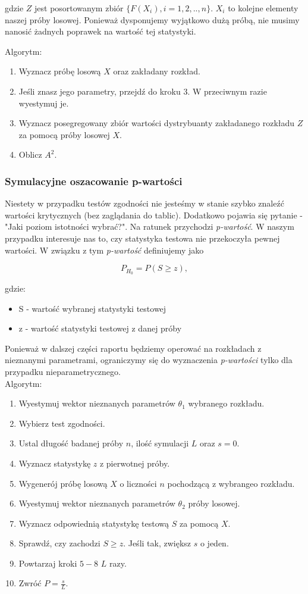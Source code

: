 \documentclass{article}
\theoremstyle{break}
\numberwithin{equation}{subsection}
\numberwithin{figure}{section}
\begin{document}
gdzie $Z$ jest posortowanym zbiór $\{F(X_i), i=1,2,..,n\}$. $X_i$ to kolejne elementy naszej próby losowej.
Ponieważ dysponujemy wyjątkowo dużą próbą, nie musimy nanosić żadnych poprawek na wartość tej statystyki.

Algorytm:

\begin{enumerate}
\item Wyznacz próbę losową $X$ oraz zakładany rozkład.
\item Jeśli znasz jego parametry, przejdź do kroku 3. W przeciwnym razie wyestymuj je.
\item Wyznacz posegregowany zbiór wartości dystrybuanty zakładanego rozkładu $Z$ za pomocą próby losowej $X$.
\item Oblicz $A^2$.
\end{enumerate}

\subsubsection{Symulacyjne oszacowanie p-wartości}

Niestety w przypadku testów zgodności nie jesteśmy w stanie szybko znaleźć wartości krytycznych (bez zaglądania do tablic). Dodatkowo pojawia się pytanie - "Jaki poziom istotności wybrać?". Na ratunek przychodzi \emph{p-wartość}. W naszym przypadku interesuje nas to, czy statystyka testowa nie przekoczyła pewnej wartości.
W związku z tym \emph{p-wartość} definiujemy jako 

$$P_{H_0} = P(S \ge z),$$

gdzie:

\begin{itemize}
\item S - wartość wybranej statystyki testowej
\item z - wartość statystyki testowej z danej próby
\end{itemize}

Ponieważ w dalszej części raportu będziemy operować na rozkładach z nieznanymi parametrami, ograniczymy się do wyznaczenia \emph{p-wartości} tylko dla przypadku nieparametrycznego.
\\
Algorytm:
\begin{enumerate}
\item Wyestymuj wektor nieznanych parametrów $\theta_1$ wybranego rozkładu.
\item Wybierz test zgodności.
\item Ustal długość badanej próby $n$, ilość symulacji $L$ oraz $s = 0$.
\item Wyznacz statystykę $z$ z pierwotnej próby.
\item Wygenerój próbę losową $X$ o liczności $n$ pochodzącą z wybrangeo rozkładu.
\item Wyestymuj wektor nieznanych parametrów  $\theta_2$ próby losowej.
\item Wyznacz odpowiednią statystykę testową $S$ za pomocą $X$.
\item Sprawdź, czy zachodzi $S \ge z$. Jeśli tak, zwiększ $s$ o jeden.
\item Powtarzaj kroki $5-8$ $L$ razy.
\item Zwróć $P = \frac{s}{L}$.
\end{enumerate}
\end{document}
